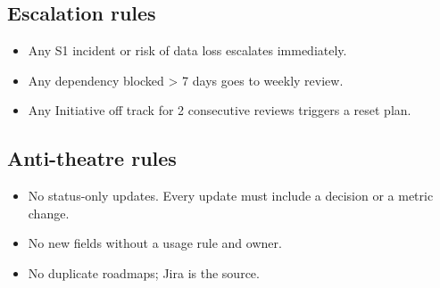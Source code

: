 \subsection*{Escalation rules}
\begin{itemize}
  \item Any S1 incident or risk of data loss escalates immediately.
  \item Any dependency blocked > 7 days goes to weekly review.
  \item Any Initiative off track for 2 consecutive reviews triggers a reset plan.
\end{itemize}

\subsection*{Anti-theatre rules}
\begin{itemize}
  \item No status-only updates. Every update must include a decision or a metric change.
  \item No new fields without a usage rule and owner.
  \item No duplicate roadmaps; Jira is the source.
\end{itemize}
